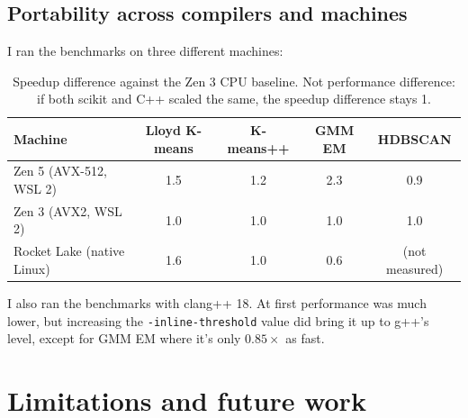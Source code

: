 \documentclass[11pt,a4paper]{article}
\newcommand{\code}[1]{\texttt{#1}}
\begin{document}
\newpage
\subsection{Portability across compilers and machines}

I ran the benchmarks on three different machines:
\begin{table}[ht]
    \centering
    \caption{Speedup difference against the Zen 3 CPU baseline. Not performance difference: if both scikit and C++ scaled the same, the speedup difference stays 1.}
    \label{tab:speedup-against-baseline}
    \begin{tabular}{lcccc}
        \toprule
        \textbf{Machine} & \textbf{Lloyd K-means} & \textbf{K-means++} & \textbf{GMM EM} & \textbf{HDBSCAN} \\
        \midrule
        Zen 5 (AVX-512, WSL 2)      & 1.5 & 1.2 & 2.3 & 0.9   \\
        Zen 3 (AVX2, WSL 2)         & 1.0 & 1.0 & 1.0 & 1.0 \\
        Rocket Lake (native Linux)  & 1.6 & 1.0 & 0.6 & (not measured)   \\
        \bottomrule
    \end{tabular}
\end{table}

I also ran the benchmarks with clang++ 18. At first performance was much lower, but increasing the \code{-inline-threshold} value did bring it up to g++'s level, except for GMM EM where it's only $0.85\times$ as fast.

\newpage
\section{Limitations and future work}
\end{document}
